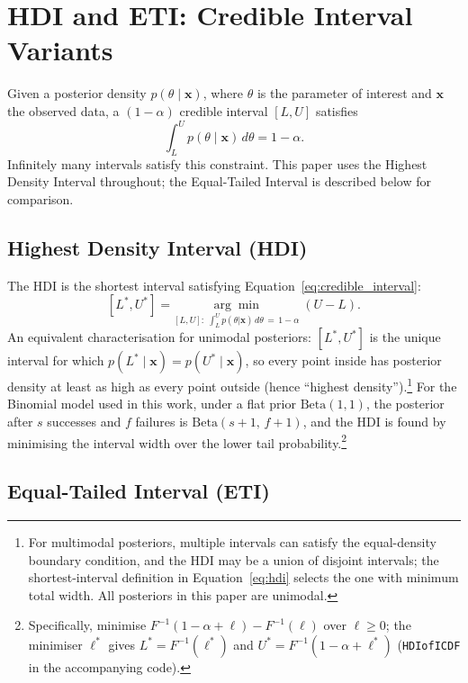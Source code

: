 \section{HDI and ETI: Credible Interval Variants}\label{app:hdi}

Given a posterior density $p(\theta \mid \mathbf{x})$, where $\theta$ is the parameter
of interest and $\mathbf{x}$ the observed data, a $(1-\alpha)$ credible interval
$[L, U]$ satisfies
\begin{equation}\label{eq:credible_interval}
  \int_L^U p(\theta \mid \mathbf{x})\,d\theta = 1 - \alpha.
\end{equation}
Infinitely many intervals satisfy this constraint. This paper uses the Highest Density
Interval throughout; the Equal-Tailed Interval is described below for comparison.

\subsection*{Highest Density Interval (HDI)}

The HDI is the shortest interval satisfying Equation~\ref{eq:credible_interval}:
\begin{equation}\label{eq:hdi}
  [L^*, U^*] = \underset{[L,U]:\;\int_L^U p(\theta|\mathbf{x})\,d\theta\,=\,1-\alpha}{\arg\min}\;(U - L).
\end{equation}
An equivalent characterisation for unimodal posteriors: $[L^*, U^*]$ is the unique
interval for which $p(L^* \mid \mathbf{x}) = p(U^* \mid \mathbf{x})$, so every point
inside has posterior density at least as high as every point outside (hence ``highest
density'').\footnote{For multimodal posteriors, multiple intervals can satisfy the
equal-density boundary condition, and the HDI may be a union of disjoint intervals;
the shortest-interval definition in Equation~\ref{eq:hdi} selects the one with minimum
total width. All posteriors in this paper are unimodal.}
For the Binomial model used in this work, under a flat prior $\mathrm{Beta}(1,1)$, the
posterior after $s$ successes and $f$ failures is $\mathrm{Beta}(s+1,\,f+1)$, and the
HDI is found by minimising the interval width over the lower tail
probability.\footnote{Specifically, minimise
  $F^{-1}(1-\alpha+\ell)-F^{-1}(\ell)$ over $\ell\geq 0$; the minimiser $\ell^*$
  gives $L^*=F^{-1}(\ell^*)$ and $U^*=F^{-1}(1-\alpha+\ell^*)$
  (\texttt{HDIofICDF} in the accompanying code).}

\subsection*{Equal-Tailed Interval (ETI)}

